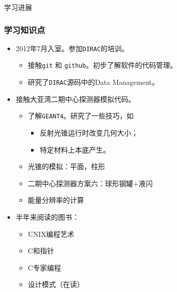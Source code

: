 
\begin{frame}
    \begin{center}
        \LARGE 学习进展
    \end{center}
\end{frame}

\begin{frame}
    \frametitle{学习知识点}
    \begin{itemize}
        \item 2012年7月入室。参加{\tt DIRAC}的培训。
            \begin{itemize}
                \item 接触{\tt git} 和 {\tt github}。初步了解软件的代码管理。
                \item 研究了{\tt DIRAC}源码中的Data Management。
            \end{itemize}
        \item 接触大亚湾二期中心探测器模拟代码。
            \begin{itemize}
                \item 了解{\tt GEANT4}。研究了一些技巧，如
                    \begin{itemize}
                        \item 反射光锥运行时改变几何大小；
                        \item 特定材料上本底产生。
                    \end{itemize}
                \item 光锥的模拟：平面，柱形
                \item 二期中心探测器方案六：球形钢罐+液闪
                \item 能量分辨率的计算
            \end{itemize}
        \item 半年来阅读的图书：
            \begin{itemize}
                \item UNIX编程艺术
                \item C和指针
                \item C专家编程
                \item 设计模式（在读）
            \end{itemize}
    \end{itemize}
\end{frame}
